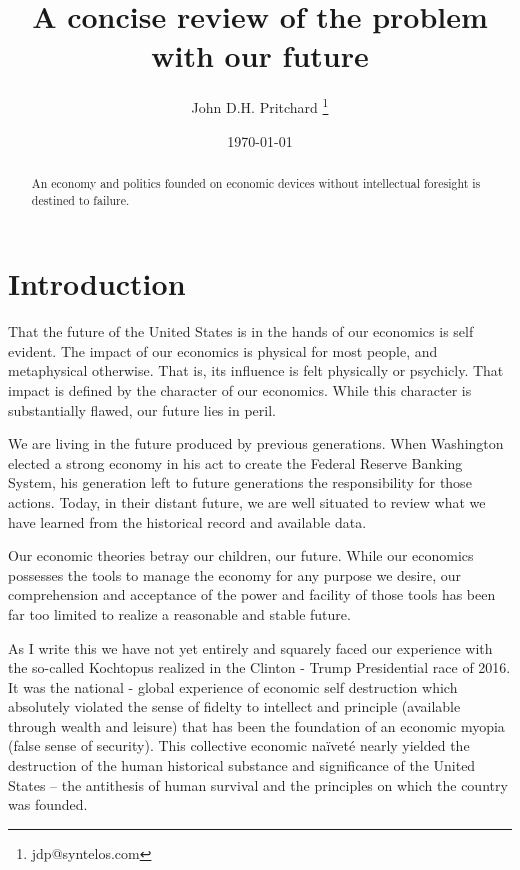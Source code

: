 \documentclass{article}
\begin{document}
\title{A concise review of the problem with our future}

\author{John D.H. Pritchard \thanks{jdp@syntelos.com}}

\date{\today}

\maketitle

\begin{abstract}
An economy and politics founded on economic devices without intellectual foresight is destined to failure.
\end{abstract}


\section{Introduction}

That the future of the United States is in the hands of our economics
is self evident.  The impact of our economics is physical for most
people, and metaphysical otherwise.  That is, its influence is felt
physically or psychicly.  That impact is defined by the character of
our economics.  While this character is substantially flawed, our
future lies in peril.

We are living in the future produced by previous generations.  When
Washington elected a strong economy in his act to create the Federal
Reserve Banking System, his generation left to future generations the
responsibility for those actions.  Today, in their distant future, we
are well situated to review what we have learned from the historical
record and available data.

Our economic theories betray our children, our future.  While our
economics possesses the tools to manage the economy for any purpose we
desire, our comprehension and acceptance of the power and facility of
those tools has been far too limited to realize a reasonable and
stable future.  

As I write this we have not yet entirely and squarely faced our
experience with the so-called Kochtopus realized in the Clinton -
Trump Presidential race of 2016.  It was the national - global
experience of economic self destruction which absolutely violated the
sense of fidelty to intellect and principle (available through wealth
and leisure) that has been the foundation of an economic myopia (false
sense of security).  This collective economic na\"{i}vet\'e nearly
yielded the destruction of the human historical substance and
significance of the United States -- the antithesis of human survival
and the principles on which the country was founded.
\end{document}
